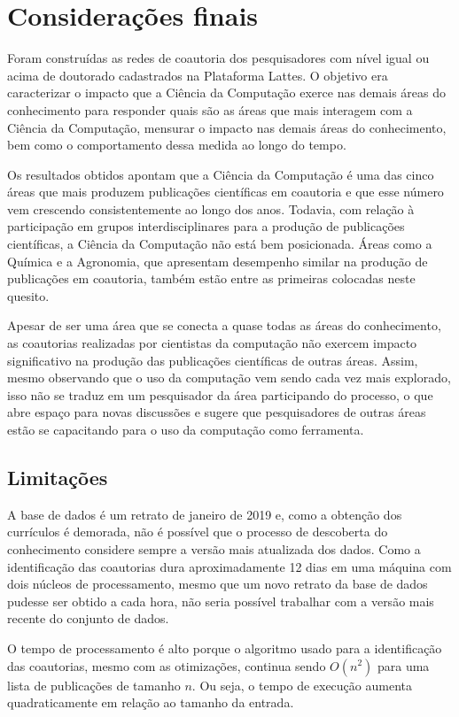 \chapter{Considerações finais}

Foram construídas as redes de coautoria dos pesquisadores com nível igual ou acima de doutorado cadastrados na Plataforma Lattes. O objetivo era caracterizar o impacto que a Ciência da Computação exerce nas demais áreas do conhecimento para responder quais são as áreas que mais interagem com a Ciência da Computação, mensurar o impacto nas demais áreas do conhecimento, bem como o comportamento dessa medida ao longo do tempo.

Os resultados obtidos apontam que a Ciência da Computação é uma das cinco áreas que mais produzem publicações científicas em coautoria e que esse número vem crescendo consistentemente ao longo dos anos. Todavia, com relação à participação em grupos interdisciplinares para a produção de publicações científicas, a Ciência da Computação não está bem posicionada. Áreas como a Química e a Agronomia, que apresentam desempenho similar na produção de publicações em coautoria, também estão entre as primeiras colocadas neste quesito.

Apesar de ser uma área que se conecta a quase todas as áreas do conhecimento, as coautorias realizadas por cientistas da computação não exercem impacto significativo na produção das publicações científicas de outras áreas. Assim, mesmo observando que o uso da computação vem sendo cada vez mais explorado, isso não se traduz em um pesquisador da área participando do processo, o que abre espaço para novas discussões e sugere que pesquisadores de outras áreas estão se capacitando para o uso da computação como ferramenta.

\section{Limitações}

A base de dados é um retrato de janeiro de 2019 e, como a obtenção dos currículos é demorada, não é possível que o processo de descoberta do conhecimento considere sempre a versão mais atualizada dos dados. Como a identificação das coautorias dura aproximadamente 12 dias em uma máquina com dois núcleos de processamento, mesmo que um novo retrato da base de dados pudesse ser obtido a cada hora, não seria possível trabalhar com a versão mais recente do conjunto de dados.

O tempo de processamento é alto porque o algoritmo usado para a identificação das coautorias, mesmo com as otimizações, continua sendo $O(n^2)$ para uma lista de publicações de tamanho $n$. Ou seja, o tempo de execução aumenta quadraticamente em relação ao tamanho da entrada.

